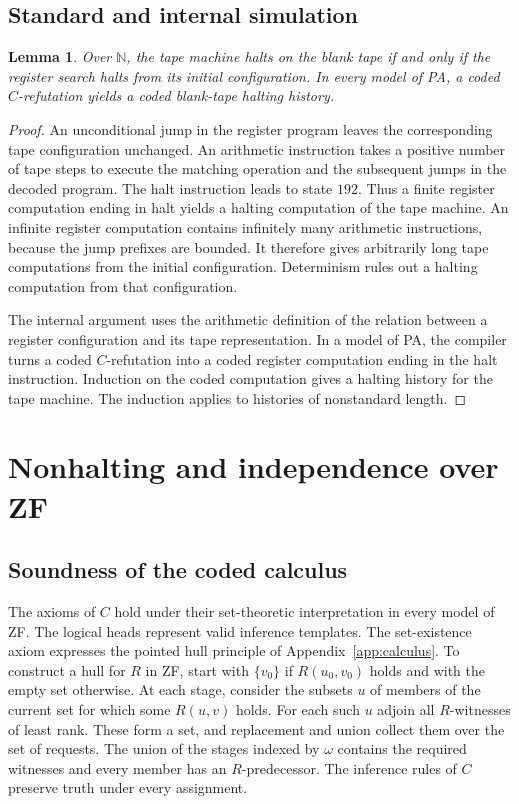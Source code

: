 \documentclass[11pt,letterpaper]{article}
\newtheorem{lemma}{Lemma}
\newcommand{\N}{\mathbb{N}}
\begin{document}
\subsection{Standard and internal simulation}

\begin{lemma}\label{lem:simulation}
Over $\N$, the tape machine halts on the blank tape if and only
if the register search halts from its initial configuration.
In every model of PA, a coded $C$-refutation yields a coded
blank-tape halting history.
\end{lemma}

\begin{proof}
An unconditional jump in the register program leaves the
corresponding tape configuration unchanged. An arithmetic
instruction takes a positive number of tape steps to execute the
matching operation and the subsequent jumps in the decoded
program. The halt instruction leads to state $192$. Thus a finite
register computation ending in halt yields a halting computation
of the tape machine. An infinite register computation contains
infinitely many arithmetic instructions, because the jump prefixes
are bounded. It therefore gives arbitrarily long tape computations
from the initial configuration. Determinism rules out a halting
computation from that configuration.

The internal argument uses the arithmetic definition of the
relation between a register configuration and its tape
representation. In a model of PA, the compiler turns a coded
$C$-refutation into a coded register computation ending in the
halt instruction. Induction on the coded computation gives a
halting history for the tape machine. The induction applies to
histories of nonstandard length.
\end{proof}

\section{Nonhalting and independence over ZF}\label{sec:independence}

\subsection{Soundness of the coded calculus}

The axioms of $C$ hold under their set-theoretic interpretation
in every model of ZF. The logical heads represent valid inference
templates. The set-existence axiom expresses the pointed hull
principle of Appendix~\ref{app:calculus}. To construct a hull for
$R$ in ZF, start with $\{v_0\}$ if $R(u_0,v_0)$ holds and with
the empty set otherwise. At each stage, consider the subsets
$u$ of members of the current set for which some $R(u,v)$ holds.
For each such $u$ adjoin all $R$-witnesses of least rank. These
form a set, and replacement and union collect them over the set
of requests. The union of the stages indexed by $\omega$
contains the required witnesses and every member has an
$R$-predecessor. The inference rules of $C$ preserve truth under
every assignment.
\end{document}

